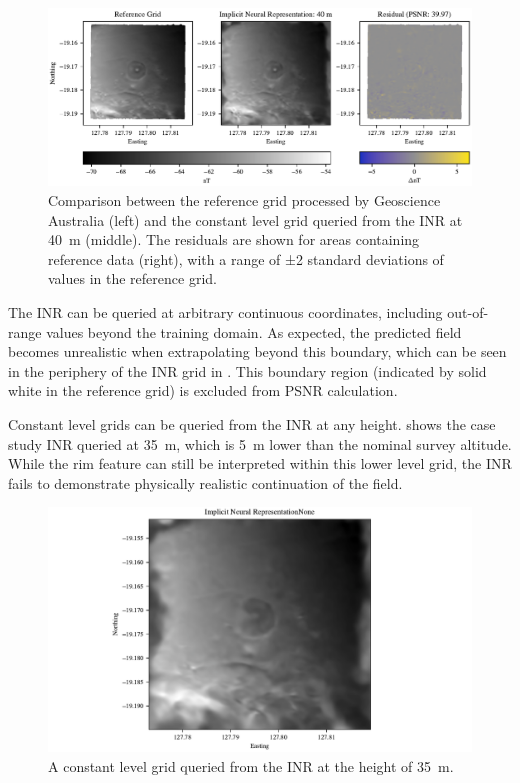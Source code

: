 \begin{figure}[hbt]
    \centering
    \includegraphics[width=1.0\linewidth]{fig/p3/P864_grid_comparison_40m.pdf}
    \caption[Grid prediction at the nominal altitude]{Comparison between the reference grid processed by Geoscience Australia (left) and the constant level grid queried from the INR at \qty{40}{\m} (middle). The residuals are shown for areas containing reference data (right), with a range of ±2 standard deviations of values in the reference grid.}
    \label{fig:grid40}
\end{figure}

The INR can be queried at arbitrary continuous coordinates, including out-of-range values beyond the training domain.
As expected, the predicted field becomes unrealistic when extrapolating beyond this boundary, which can be seen in the periphery of the INR grid in .
This boundary region (indicated by solid white in the reference grid) is excluded from PSNR calculation.

Constant level grids can be queried from the INR at any height.
 shows the case study INR queried at \qty{35}{\m}, which is \qty{5}{\m} lower than the nominal survey altitude.
While the rim feature can still be interpreted within this lower level grid, the INR fails to demonstrate physically realistic continuation of the field.

\begin{figure}[hbt]
    \centering
    \includegraphics[width=1.0\linewidth]{fig/p3/35_level_grid.pdf}
    \caption[Grid prediction outside the nominal altitude]{A constant level grid queried from the INR at the height of \qty{35}{\m}.}
    \label{fig:grid35}
\end{figure}

